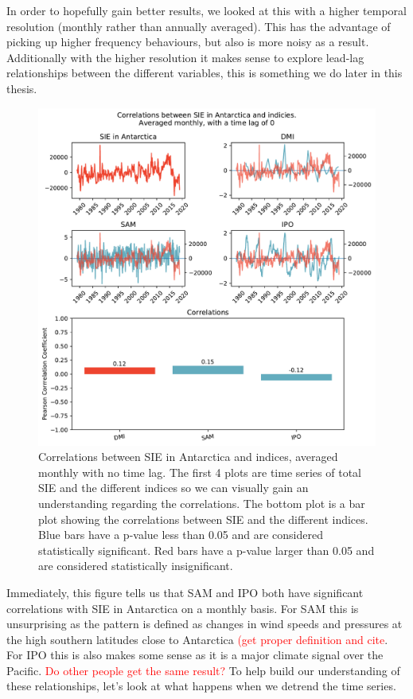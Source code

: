 In order to hopefully gain better results, we looked at this with a higher temporal resolution (monthly rather than annually averaged). This has the advantage of picking up higher frequency behaviours, but also is more noisy as a result. Additionally with the higher resolution it makes sense to explore lead-lag relationships between the different variables, this is something we do later in this thesis.


\begin{figure}[H]
    \centering
    \includegraphics[width = \linewidth]{Images_3.0/correlations/subplots_indicies_monthly_0_anomalous.pdf}
    \caption[Correlations between SIE in Antarctica and indices, averaged monthly with no time lag.]{Correlations between SIE in Antarctica and indices, averaged monthly with no time lag. The first 4 plots are time series of total SIE and the different indices so we can visually gain an understanding regarding the correlations. The bottom plot is a bar plot showing the correlations between SIE and the different indices. Blue bars have a p-value less than 0.05 and are considered statistically significant. Red bars have a p-value larger than 0.05 and are considered statistically insignificant.}
    \label{fig:seasonal_with_trend}
\end{figure}
Immediately, this figure tells us that SAM and IPO both have significant correlations with SIE in Antarctica on a monthly basis. For SAM this is unsurprising as the pattern is defined as changes in wind speeds and pressures at the high southern latitudes close to Antarctica \textcolor{red}{(get proper definition and cite}. For IPO this is also makes some sense as it is a major climate signal over the Pacific. \textcolor{red}{Do other people get the same result?} To help build our understanding of these relationships, let's look at what happens when we detrend the time series.

